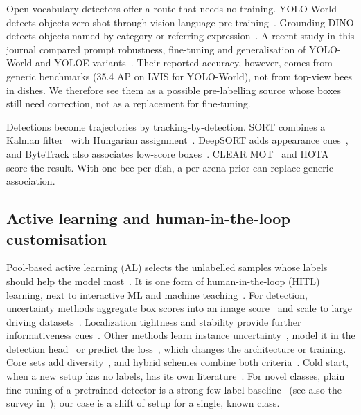 \documentclass[pdflatex,sn-basic,Numbered]{sn-jnl}
\theoremstyle{thmstyleone}%
\begin{document}
Open-vocabulary detectors offer a route that needs no training. YOLO-World detects objects zero-shot through vision-language pre-training~\cite{cheng2024yoloworld}. Grounding DINO detects objects named by category or referring expression~\cite{liu2024grounding}. A recent study in this journal compared prompt robustness, fine-tuning and generalisation of YOLO-World and YOLOE variants~\cite{ozuberk2026prompt}. %
Their reported accuracy, however, comes from generic benchmarks (35.4 AP on LVIS for YOLO-World), not from top-view bees in dishes. We therefore see them as a possible pre-labelling source whose boxes still need correction, not as a replacement for fine-tuning.

Detections become trajectories by tracking-by-detection. SORT combines a Kalman filter~\cite{kalman1960new} with Hungarian assignment~\cite{kuhn1955hungarian,bewley2016simple}. DeepSORT adds appearance cues~\cite{wojke2017simple}, and ByteTrack also associates low-score boxes~\cite{zhang2022bytetrack}. CLEAR MOT~\cite{bernardin2008evaluating} and HOTA~\cite{luiten2020hota} score the result. With one bee per dish, a per-arena prior can replace generic association.

\subsection{Active learning and human-in-the-loop customisation}\label{sec:rw-al}

Pool-based active learning (AL) selects the unlabelled samples whose labels should help the model most~\cite{settles2009active,ren2021survey}. It is one form of human-in-the-loop (HITL) learning, next to interactive ML and machine teaching~\cite{mosqueirarey2022human}. For detection, uncertainty methods aggregate box scores into an image score~\cite{brust2019active} and scale to large driving datasets~\cite{haussmann2020scalable}. Localization tightness and stability provide further informativeness cues~\cite{kao2019localization}. Other methods learn instance uncertainty~\cite{yuan2021multiple}, model it in the detection head~\cite{choi2021active} or predict the loss~\cite{yoo2019learning}, which changes the architecture or training. Core sets add diversity~\cite{sener2018active}, and hybrid schemes combine both criteria~\cite{yang2024plug}. Cold start, when a new setup has no labels, has its own literature~\cite{chandra2020initial}. For novel classes, plain fine-tuning of a pretrained detector is a strong few-label baseline~\cite{wang2020frustratingly} (see also the survey in~\cite{antonelli2022fewshot}); our case is a shift of setup for a single, known class.
\end{document}
